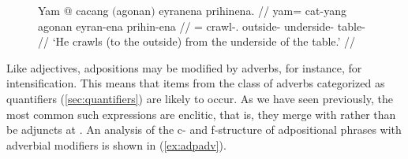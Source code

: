 \begin{figure}[h]
\ex\label{ex:nostackprep}\begingl
	\gla Yam @ cacang $($agonan$)$ eyranena prihinena. //
	\glb yam= cat-yang agonan eyran-ena prihin-ena //
	\glc \DatT{}= crawl-\TsgM{}.\Aarg{} outside-\Top{} underside-\Gen{}
		table-\Gen{} //
	\glft `He crawls (to the outside) from the underside of the table.' //
\endgl\xe
\end{figure}

Like adjectives, adpositions may be modified by adverbs, for instance, for
intensification. This means that items from the class of adverbs categorized as
quantifiers (\autoref{sec:quantifiers}) are likely to occur. As we have seen
previously, the most common such expressions are enclitic, that is, they merge
with  rather than be adjuncts at . An analysis of the c- and
f-structure of adpositional phrases with adverbial modifiers is shown in 
(\ref{ex:adpadv}).

